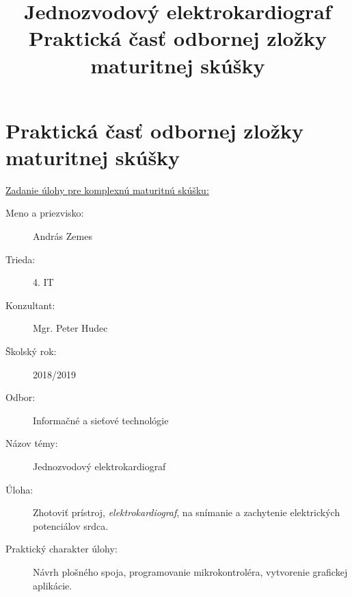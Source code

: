 \documentclass[titlepage,12pt]{article}
\title{\textbf{Jednozvodový elektrokardiograf} \\
\large Praktická časť odbornej zložky maturitnej skúšky}
\date{\empty}
\begin{document}
\bgroup
	 {
		\fancyfoot[C] {\empty}		
	}
	\maketitle
\egroup

\restoregeometry

\section*{Praktická časť odbornej zložky maturitnej skúšky}
\noindent
\underline{Zadanie úlohy pre komplexnú maturitnú skúšku:} 
\newline

\begin{description}
	\item [Meno a priezvisko:]
		\tabto{5cm} András Zemes
		
    \item [Trieda:]	
    	\tabto{5cm} 4. IT
    	
	\item [Konzultant:]		 	  
		\tabto{5cm} Mgr. Peter Hudec
		
	\item [Školský rok:] 
		\tabto{5cm} 2018/2019
		
	\item [Odbor:]		  
		\tabto{5cm} Informačné a sieťové technológie
		
	\item [Názov témy:]			  
		\tabto{5cm} Jednozvodový elektrokardiograf 
		
	\item [Úloha:]				  
		\tabto{5cm} Zhotoviť prístroj, \emph{elektrokardiograf}, na snímanie 
		\tabto{5cm} a zachytenie elektrických potenciálov srdca.
	
	\item [Praktický charakter úlohy:]
		\tabto{5cm} Návrh plošného spoja, programovanie 
		\tabto{5cm} mikrokontroléra, vytvorenie grafickej aplikácie.
		
\end{description}
	
\end{document}
